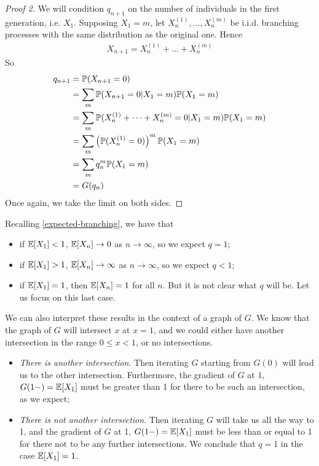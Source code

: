 \documentclass{../template/note}
\begin{document}
    \begin{proof}[Proof 2]
        We will condition \(q_{n+1}\) on the number of individuals in the first generation, i.e. \(X_1\). Supposing \(X_1 = m\), let \(X_n^{(1)}, \dots, X_n^{(m)}\) be i.i.d. branching processes with the same distribution as the original one. Hence
        \begin{align*}
            X_{n+1} = X_n^{(1)} + \dots + X_n^{(m)}
        \end{align*}
        So
        \begin{align*}
            q_{n+1} &= \mathbb P(X_{n+1} = 0) \\
            &= \sum_m \mathbb P(X_{n+1} = 0 | X_1 = m) \mathbb P(X_1 = m) \\
            &= \sum_m \mathbb P(X_n^{(1)} + \dots + X_n^{(m)} = 0 | X_1 = m) \mathbb P(X_1 = m) \\
            &= \sum_m \left(\mathbb P(X_n^{(1)} = 0)\right)^m \mathbb P(X_1 = m) \\
            &= \sum_m q_n^m \mathbb P(X_1 = m) \\ &= G(q_n)
        \end{align*}
        Once again, we take the limit on both sides.
    \end{proof}

    
    Recalling \cref{expected-branching}, we have that
    \begin{itemize}
        \item if \(\mathbb E[X_1] < 1\), \(\mathbb E[X_n] \to 0\) as \(n \to \infty\), so we expect \(q=1\);
        \item if \(\mathbb E[X_1] > 1\), \(\mathbb E[X_n] \to \infty\) as \(n \to \infty\), so we expect \(q<1\);
        \item if \(\mathbb E[X_1] = 1\), then \(\mathbb E[X_n] = 1\) for all \(n\). But it is not clear what \(q\) will be. Let us focus on this last case.
    \end{itemize}

    We can also interpret these results in the context of a graph of \(G\). We know that the graph of \(G\) will intersect \(x\) at \(x=1\), and we could either have another intersection in the range \(0 \leq x < 1\), or no intersections.

    \begin{itemize}
        \item \emph{There is another intersection}. Then iterating \(G\) starting from \(G(0)\) will lead us to the other intersection. Furthermore, the gradient of \(G\) at \(1\), \(G(1-) = \mathbb E[X_1]\) must be greater than 1 for there to be such an intersection, as we expect;
        \item \emph{There is not another intersection}. Then iterating \(G\) will take us all the way to 1, and the gradient of \(G\) at 1, \(G(1-) = \mathbb E[X_1]\) must be less than or equal to 1 for there not to be any further intersections. We conclude that \(q = 1\) in the case \(\mathbb E[X_1] = 1\).
    \end{itemize}
    
\end{document}

